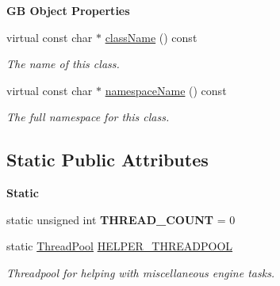 \begin{Indent}\textbf{ GB Object Properties}\par
\begin{DoxyCompactItemize}
\item 
virtual const char $\ast$ \mbox{\hyperlink{classrev_1_1_core_engine_a2ae64bfe54f092fe37b4415ca56df1b5}{class\+Name}} () const
\begin{DoxyCompactList}\small\item\em The name of this class. \end{DoxyCompactList}\item 
virtual const char $\ast$ \mbox{\hyperlink{classrev_1_1_core_engine_aa45b34f7023b9f0e3b30f8b1259aa389}{namespace\+Name}} () const
\begin{DoxyCompactList}\small\item\em The full namespace for this class. \end{DoxyCompactList}\end{DoxyCompactItemize}
\end{Indent}
\subsection*{Static Public Attributes}
\begin{Indent}\textbf{ Static}\par
\begin{DoxyCompactItemize}
\item 
\mbox{\label{classrev_1_1_core_engine_ad25340b0d6404f200024f4fda04b540b}} 
static unsigned int {\bfseries T\+H\+R\+E\+A\+D\+\_\+\+C\+O\+U\+NT} = 0
\item 
\mbox{\label{classrev_1_1_core_engine_a932398fcdc6cb76543c04ec83425ba0b}} 
static \mbox{\hyperlink{classrev_1_1_thread_pool}{Thread\+Pool}} \mbox{\hyperlink{classrev_1_1_core_engine_a932398fcdc6cb76543c04ec83425ba0b}{H\+E\+L\+P\+E\+R\+\_\+\+T\+H\+R\+E\+A\+D\+P\+O\+OL}}
\begin{DoxyCompactList}\small\item\em Threadpool for helping with miscellaneous engine tasks. \end{DoxyCompactList}\end{DoxyCompactItemize}
\end{Indent}
